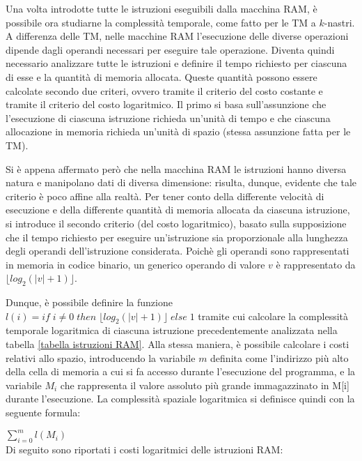   Una volta introdotte tutte le istruzioni eseguibili dalla macchina RAM, è possibile ora studiarne la complessità temporale, come fatto per le TM a \(k\)-nastri. A differenza delle TM, nelle macchine RAM l'esecuzione delle diverse operazioni dipende dagli operandi necessari per eseguire tale operazione. Diventa quindi necessario analizzare tutte le istruzioni e definire il tempo richiesto per ciascuna di esse e la quantità di memoria allocata. Queste quantità possono essere calcolate secondo due criteri, ovvero tramite il criterio del costo costante e tramite il criterio del costo logaritmico. Il primo si basa sull'assunzione che l'esecuzione di ciascuna istruzione richieda un'unità di tempo e che ciascuna allocazione in memoria richieda un'unità di spazio (stessa assunzione fatta per le TM). 
  
  Si è appena affermato però che nella macchina RAM le istruzioni hanno diversa natura e manipolano dati di diversa dimensione: risulta, dunque, evidente che tale criterio è poco affine alla realtà. Per tener conto della differente velocità di esecuzione e della differente quantità di memoria allocata da ciascuna istruzione, si introduce il secondo criterio (del costo logaritmico), basato sulla supposizione che il tempo richiesto per eseguire un'istruzione sia proporzionale alla lunghezza degli operandi dell'istruzione considerata. Poichè gli operandi sono rappresentati in memoria in codice binario, un generico operando di valore \(v\) è rappresentato da \(\lfloor log_2(|v|+1)\rfloor\). 
  
  Dunque, è possibile definire la funzione \(l(i) = if\;i\neq 0\;then\;\lfloor log_2(|v|+1)\rfloor\;else\;1\) tramite cui calcolare la complessità temporale logaritmica di ciascuna istruzione precedentemente analizzata nella tabella \ref{tabella istruzioni RAM}. Alla stessa maniera, è possibile calcolare i costi relativi allo spazio, introducendo la variabile \(m\) definita come l'indirizzo più alto della cella di memoria a cui si fa accesso durante l'esecuzione del programma, e la variabile \(M_i\) che rappresenta il valore assoluto più grande immagazzinato in M[i] durante l'esecuzione. La complessità spaziale logaritmica si definisce quindi con la seguente formula:

  \(\displaystyle \sum_{i=0}^m{l(M_i)}\)\\
  Di seguito sono riportati i costi logaritmici delle istruzioni RAM:

